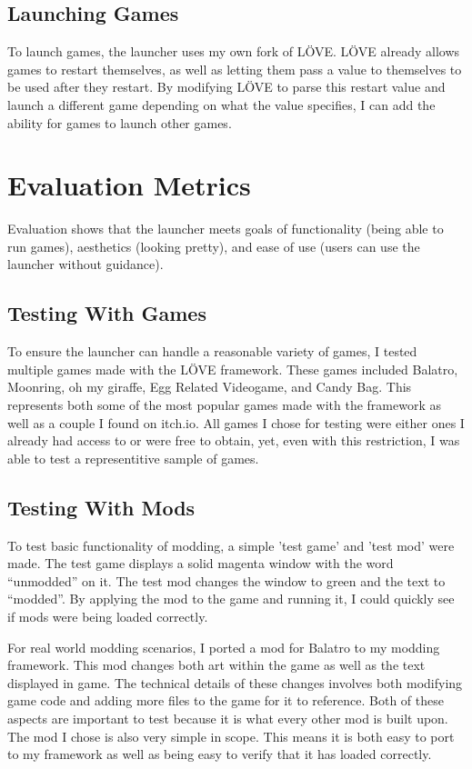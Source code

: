 \documentclass[10pt,twocolumn]{article}
\begin{document}
\subsection{Launching Games}

To launch games, the launcher uses my own fork of LÖVE. LÖVE already allows
games to restart themselves, as well as letting them pass a value to themselves
to be used after they restart. By modifying LÖVE to parse this restart value
and launch a different game depending on what the value specifies, I can add the
ability for games to launch other games.

\section{Evaluation Metrics}

Evaluation shows that the
launcher meets goals of functionality
(being able to run games), aesthetics (looking pretty),
and ease of use (users can use the
launcher without guidance).

\subsection{Testing With Games}

To ensure the launcher can handle a reasonable variety of games, I tested
multiple games made with the LÖVE framework. These games included
Balatro, Moonring, oh my giraffe, Egg Related Videogame, and Candy Bag.
This represents both some of the most popular games made with the framework
as well as a couple I found on itch.io. All games I chose for testing were
either ones I already had access to or were free to obtain, yet, even with
this restriction, I was able to test a representitive sample of games.

\subsection{Testing With Mods}

To test basic functionality of modding, a simple 'test game' and 'test mod'
were made. The test game displays a solid magenta window with the word
``unmodded'' on it. The test mod changes the window to green and the text
to ``modded''. By applying the mod to the game and running it, I could quickly
see if mods were being loaded correctly.

For real world modding scenarios, I ported a mod for Balatro to my modding
framework. This mod changes both art within the game as well as the text
displayed in game. The technical details of these changes involves both
modifying game code and adding more files to the game for it to reference.
Both of these aspects are important to test because it is what every other
mod is built upon.
The mod I chose is also very simple in scope. This means it is both easy to
port to my framework as well as being easy to verify that it has loaded
correctly.
\end{document}
